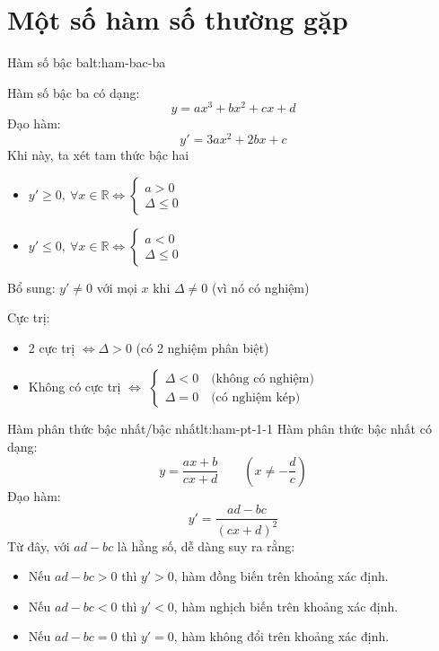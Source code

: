 \section{Một số hàm số thường gặp}
\begin{lythuyetbox}{Hàm số bậc ba}{lt:ham-bac-ba}

  Hàm số bậc ba có dạng:
  \[ y = ax^3 + bx^2 + cx + d \]
  Đạo hàm:
  \[ y' = 3a x^2 + 2b x + c \]
  Khi này, ta xét tam thức bậc hai
  \begin{itemize}
      \item $y' \geq 0,\ \forall x \in \mathbb{R} \Leftrightarrow \begin{cases} a > 0 \\ \Delta \leq 0 \end{cases}$
      \item $y' \leq 0,\ \forall x \in \mathbb{R} \Leftrightarrow \begin{cases} a < 0 \\ \Delta \leq 0 \end{cases}$ 
  \end{itemize}
  Bổ sung: $y' \neq 0$ với mọi $x$ khi $\Delta \neq 0$ (vì nó có nghiệm)

  \vspace{1.5em}
  Cực trị:
  \begin{itemize}
      \item 2 cực trị $\Leftrightarrow \Delta > 0$ (có 2 nghiệm phân biệt)
      \item Không có cực trị $\Leftrightarrow$
      $\left\{\begin{array}{l}
          \Delta < 0 \quad \text{(không có nghiệm)} \\
          \Delta = 0 \quad \text{(có nghiệm kép)}
      \end{array}\right.$
  \end{itemize}

\end{lythuyetbox}

\begin{lythuyetbox}{Hàm phân thức bậc nhất/bậc nhất}{lt:ham-pt-1-1}
  Hàm phân thức bậc nhất có dạng:
  \[ y = \frac{ax + b}{cx + d} \qquad (x \neq -\frac{d}{c}) \]
  Đạo hàm:
  \[ y' = \frac{ad-bc}{(cx + d)^2} \]
  Từ đây, với $ad - bc$ là hằng số, dễ dàng suy ra rằng:
  \begin{itemize}
      \item Nếu $ad - bc > 0$ thì $y' > 0$, hàm đồng biến trên khoảng xác định.
      \item Nếu $ad - bc < 0$ thì $y' < 0$, hàm nghịch biến trên khoảng xác định.
      \item Nếu $ad - bc = 0$ thì $y' = 0$, hàm không đổi trên khoảng xác định.
  \end{itemize}

\end{lythuyetbox}

